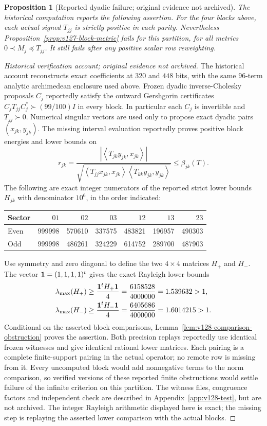 \documentclass[11pt]{article}
\newtheorem{proposition}[theorem]{Proposition}
\theoremstyle{remark}
\newcommand{\ip}[2]{\left\langle #1,#2\right\rangle}
\begin{document}
\begin{proposition}[Reported dyadic failure; original evidence not archived]
\label{prop:v128-dyadic-fails}
The historical computation reports the following assertion. For the four blocks above, each actual signed $T_{jj}$ is strictly
positive in each parity. Nevertheless
Proposition~\ref{prop:v127-block-metric} fails for this partition,
for all metrics $0\prec M_j\preceq T_{jj}$. It still fails after
any positive scalar row reweighting.
\end{proposition}
\begin{proof}[Historical verification account; original evidence not archived]
The historical account reconstructs exact coefficients at $320$ and
$448$ bits, with the
same $96$-term analytic archimedean enclosure used above. Frozen
dyadic inverse-Cholesky proposals $C_j$ reportedly satisfy the outward
Gershgorin certificates $C_jT_{jj}C_j^*\succ(99/100)I$ in every
block. In particular each $C_j$ is invertible and $T_{jj}\succ0$.
Numerical singular vectors are used only to propose exact dyadic
pairs $(x_{jk},y_{jk})$. The missing interval evaluation reportedly proves positive
block energies and lower bounds on
\[
 r_{jk}=\frac{|\ip{T_{jk}y_{jk}}{x_{jk}}|}
 {\sqrt{\ip{T_{jj}x_{jk}}{x_{jk}}
              \ip{T_{kk}y_{jk}}{y_{jk}}}}
 \le\beta_{jk}(T).
\]
The following are exact integer numerators of the reported strict lower bounds
$H_{jk}$ with denominator $10^6$, in the order indicated:
\begin{center}
\begin{tabular}{lrrrrrr}
\toprule
Sector & $01$ & $02$ & $03$ & $12$ & $13$ & $23$\\
\midrule
Even &999998&570610&337575&483821&196957&490303\\
Odd  &999998&486261&324229&614752&289700&487903\\
\bottomrule
\end{tabular}
\end{center}
Use symmetry and zero diagonal to define the two $4\times4$ matrices
$H_+$ and $H_-$. The vector ${\bf1}=(1,1,1,1)^t$ gives the exact
Rayleigh lower bounds
\begin{align*}
 \lambda_{\max}(H_+)&\ge
 \frac{{\bf1}^tH_+{\bf1}}4
 =\frac{6158528}{4000000}=1.539632>1,\\
 \lambda_{\max}(H_-)&\ge
 \frac{{\bf1}^tH_-{\bf1}}4
 =\frac{6405686}{4000000}=1.6014215>1.
\end{align*}
Conditional on the asserted block comparisons,
Lemma~\ref{lem:v128-comparison-obstruction} proves the assertion.
Both precision replays reportedly use identical frozen witnesses and give
identical rational lower matrices. Each pairing is a complete
finite-support pairing in the actual operator; no remote row is
missing from it. Every uncomputed block would add nonnegative terms
to the norm comparison, so verified versions of these reported finite
obstructions would settle failure of the infinite criterion on this partition. The witness files,
congruence factors and independent check are described in
Appendix~\ref{app:v128-test}, but are not archived. The integer
Rayleigh arithmetic displayed here is exact; the missing step is
replaying the asserted lower comparison with the actual blocks.
\end{proof}
\end{document}
